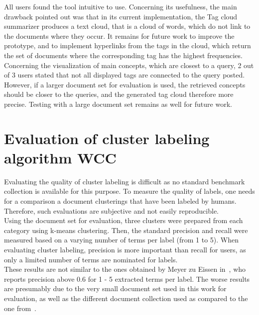 All users found the tool intuitive to use. Concerning its usefulness, the main drawback pointed out was that in its current implementation, the Tag cloud summarizer produces a text cloud, that is a cloud of words, which do not link to the documents where they occur. It remains for future work to improve the prototype, and to implement hyperlinks from the tags in the cloud, which return the set of documents where the corresponding tag has the highest frequencies. Concerning the visualization of main concepts, which are closest to a query, 2 out of 3 users stated that not all displayed tags are connected to the query posted. However, if a larger document set for evaluation is used, the retrieved concepts should be closer to the queries, and the generated tag cloud therefore more precise. Testing with a large document set remains as well for future work. 

\section{Evaluation of cluster labeling algorithm WCC}
Evaluating the quality of cluster labeling is difficult as no standard benchmark collection is available for this purpose. To measure the quality of labels, one needs for a comparison a document clusterings that have been labeled by humans. Therefore, such evaluations are subjective and not easily reproducible. \\

Using the document set for evaluation, three clusters were prepared from each category using k-means clustering. Then, the standard precision and recall were measured based on a varying number of terms per label (from 1 to 5). When evaluating cluster labeling, precision is more important than recall for users, as only a limited number of terms are nominated for labels. \\


These results are not similar to the ones obtained by Meyer zu Eissen in~\cite{eissen_phd_2007}, who reports precision above 0.6 for 1 - 5 extracted terms per label. The worse results are presumably due to the very small document set used in this work for evaluation, as well as the different document collection used as compared to the one from~\cite{eissen_phd_2007}.  

